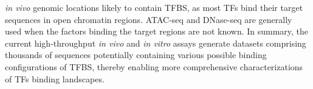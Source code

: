 \documentclass[a4paper, titlepage, openright]{book}
\begin{document}
\emph{in vivo} genomic locations likely to contain TFBS, as most TFs bind their target sequences in open chromatin regions. ATAC-seq and DNase-seq are generally used when the factors binding the target regions are not known. In summary, the current high-throughput \emph{in vivo} and \emph{in vitro} assays generate datasets comprising thousands of sequences potentially containing various possible binding configurations of TFBS, thereby enabling more comprehensive characterizations of TFs binding landscapes.

\begin{table}[]
    \centering
\end{table}
\end{document}

